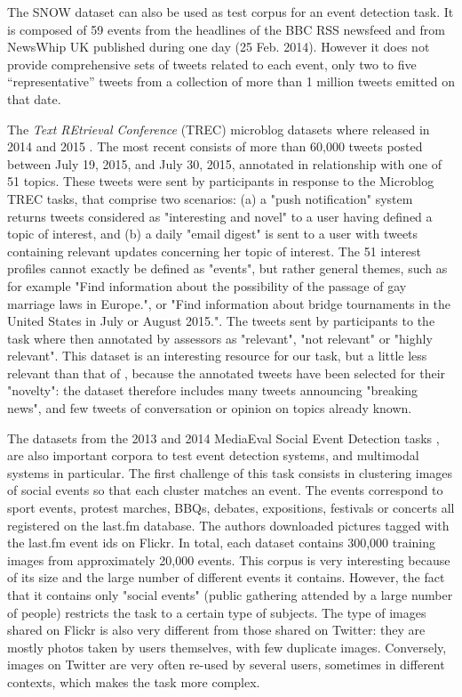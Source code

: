 The SNOW dataset \citep{papadopoulos_snow_2014} can also be used as test corpus for an event detection task. It is composed of 59 events from the headlines of the BBC RSS newsfeed and from NewsWhip UK published during one day (25 Feb. 2014). However it does not provide comprehensive sets of tweets related to each event, only two to five “representative” tweets from a collection of more than 1 million tweets emitted on that date.

The \textit{Text REtrieval Conference} (TREC) microblog datasets where released in 2014 \cite{lin2014overview} and 2015 \cite{lin2015overview}. The most recent consists of more than 60,000 tweets posted between July 19, 2015, and July 30, 2015, annotated in relationship with one of 51 topics. These tweets were sent by participants in response to the Microblog TREC tasks, that comprise two scenarios: (a) a "push notification" system returns tweets considered as "interesting and novel" to a user having defined a topic of interest, and (b) a daily "email digest" is sent to a user with tweets containing relevant updates concerning her topic of interest. The 51 interest profiles cannot exactly be defined as "events", but rather general themes, such as for example "Find information about the possibility of the passage of gay marriage laws in Europe.", or "Find information about bridge tournaments in the United States in July or August 2015.". The tweets sent by participants to the task where then annotated by assessors as "relevant", "not relevant" or "highly relevant". This dataset is an interesting resource for our task, but a little less relevant than that of \citet{mcminn_building_2013}, because the annotated tweets have been selected for their "novelty": the dataset therefore includes many tweets announcing "breaking news", and few tweets of conversation or opinion on topics already known.

The datasets from the 2013 and 2014 MediaEval Social Event Detection tasks \cite{reuter2013social, petkos2014social}, are also important corpora to test event detection systems, and multimodal systems in particular. The first challenge of this task consists in clustering images of social events so that each cluster matches an event. The events correspond to sport events, protest marches, BBQs, debates, expositions, festivals or concerts all registered on the last.fm database. The authors downloaded pictures tagged with the last.fm event ids on Flickr. In total, each dataset contains 300,000 training images from approximately 20,000 events. This corpus is very interesting because of its size and the large number of different events it contains. However, the fact that it contains only "social events" (public gathering attended by a large number of people) restricts the task to a certain type of subjects. The type of images shared on Flickr is also very different from those shared on Twitter: they are mostly photos taken by users themselves, with few duplicate images. Conversely, images on Twitter are very often re-used by several users, sometimes in different contexts, which makes the task more complex. 

